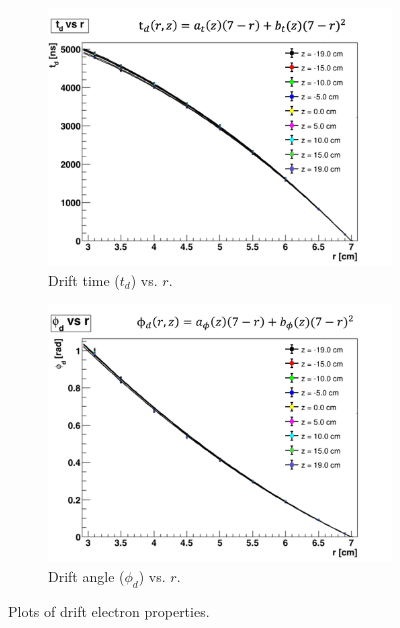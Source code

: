 \begin{figure}[h!]
	\centering
	\begin{subfigure}[b]{0.49\textwidth}
		\includegraphics[width=\textwidth]{figures/drifte_t_vs_r.png}
		\caption{Drift time ($t_d$) vs. $r$.}
		\label{fig:drifte_t_vs_r}
	\end{subfigure}
	\begin{subfigure}[b]{0.49\textwidth}
		\includegraphics[width=\textwidth]{figures/drifte_phi_vs_r.png}
		\caption{Drift angle ($\phi_d$) vs. $r$.}
		\label{fig:drifte_phi_vs_r}
	\end{subfigure}
	\caption{Plots of drift electron properties.}
\end{figure}

